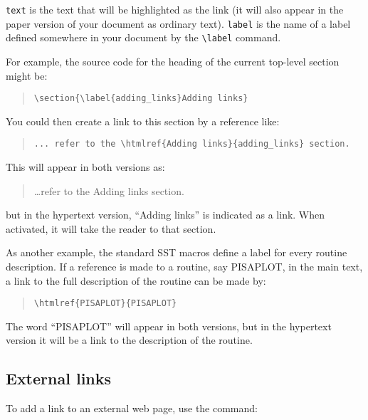 \documentclass[twoside,11pt]{article}
\newcommand{\htmlref}[2]{#1}
\newcommand{\xlabel}[1]{}
\renewcommand{\_}{\texttt{\symbol{95}}}
\begin{document}
\texttt{text} is the text that will be highlighted as the link (it will also
appear in the paper version of your document as ordinary text).
\texttt{label} is the name of a label defined somewhere in your document by
the \verb#\label# command.

For example, the source code for the heading of the current top-level section
might be:

\begin{quote}
\verb+\section{\label{adding_links}Adding links}+
\end{quote}

You could then create a link to this section by a reference like:

\begin{quote}
\verb+... refer to the \htmlref{Adding links}{adding_links} section.+
\end{quote}

This will appear in both versions as:

\begin{quote}
\ldots refer to the Adding links section.
\end{quote}

but in the hypertext version, ``Adding links'' is indicated as a link.
When activated, it will take the reader to that section.

As another example, the standard SST macros define a label for every routine
description.
If a reference is made to a routine, say PISAPLOT, in the main text, a link
to the full description of the routine can be made by:

\begin{quote}
\begin{verbatim}
\htmlref{PISAPLOT}{PISAPLOT}
\end{verbatim}
\end{quote}

The word ``PISAPLOT'' will appear in both versions, but in the hypertext version
it will be a link to the description of the routine.

\subsection{\xlabel{external_links}External links}

To add a link to an external web page, use the command:
\end{document}

